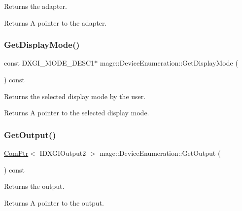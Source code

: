 Returns the adapter.

\begin{DoxyReturn}{Returns}
A pointer to the adapter. 
\end{DoxyReturn}
\hypertarget{classmage_1_1_device_enumeration_a533ac2f6ea91604a3ea3cc8d93c3de87}{}\label{classmage_1_1_device_enumeration_a533ac2f6ea91604a3ea3cc8d93c3de87} 
\subsubsection{\texorpdfstring{Get\+Display\+Mode()}{GetDisplayMode()}}
{\footnotesize\ttfamily const D\+X\+G\+I\+\_\+\+M\+O\+D\+E\+\_\+\+D\+E\+S\+C1$\ast$ mage\+::\+Device\+Enumeration\+::\+Get\+Display\+Mode (\begin{DoxyParamCaption}{ }\end{DoxyParamCaption}) const}

Returns the selected display mode by the user.

\begin{DoxyReturn}{Returns}
A pointer to the selected display mode. 
\end{DoxyReturn}
\hypertarget{classmage_1_1_device_enumeration_ac3958dd53d2fdb8ff645d8dca6dc5fdd}{}\label{classmage_1_1_device_enumeration_ac3958dd53d2fdb8ff645d8dca6dc5fdd} 
\subsubsection{\texorpdfstring{Get\+Output()}{GetOutput()}}
{\footnotesize\ttfamily \hyperlink{namespacemage_ae74f374780900893caa5555d1031fd79}{Com\+Ptr}$<$ I\+D\+X\+G\+I\+Output2 $>$ mage\+::\+Device\+Enumeration\+::\+Get\+Output (\begin{DoxyParamCaption}{ }\end{DoxyParamCaption}) const}

Returns the output.

\begin{DoxyReturn}{Returns}
A pointer to the output. 
\end{DoxyReturn}
\hypertarget{classmage_1_1_device_enumeration_a56806d9667b446bf14236b1f42aefb28}{}\label{classmage_1_1_device_enumeration_a56806d9667b446bf14236b1f42aefb28} 
